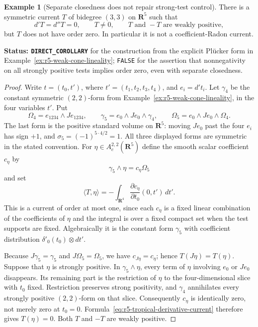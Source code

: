 \documentclass[11pt,a4paper]{article}
\numberwithin{equation}{section}
\theoremstyle{definition}
\newtheorem{example}[theorem]{Example}
\theoremstyle{remark}
\begin{document}
\begin{example}[Separate closedness does not repair strong-test control]
\label{ex:r5-closed-weak-nonradon-tropical}
There is a symmetric current $T$ of bidegree $(3,3)$ on
$\mathbf R^5$ such that
\[
 d'T=d''T=0,\qquad T\ne0,\qquad
 T\text{ and }-T\text{ are weakly positive},
\]
but $T$ does not have order zero.  In particular it is not a
coefficient-Radon current.
\end{example}

\noindent\textbf{Status: \texttt{DIRECT\_COROLLARY}} for the
construction from the explicit Pl\"ucker form in
Example~\ref{ex:r5-weak-cone-lineality};
\texttt{FALSE} for the assertion that nonnegativity on all strongly
positive tests implies order zero, even with separate closedness.

\begin{proof}
Write $t=(t_0,t')$, where $t'=(t_1,t_2,t_3,t_4)$, and
$e_i=d't_i$.  Let $\gamma_4$ be the constant symmetric
$(2,2)$-form from Example~\ref{ex:r5-weak-cone-lineality}, in the
four variables $t'$.  Put
\[
 \Omega_4=e_{1234}\wedge Je_{1234},\qquad
 \gamma_5=e_0\wedge Je_0\wedge\gamma_4,\qquad
 \Omega_5=e_0\wedge Je_0\wedge\Omega_4.
\]
The last form is the positive standard volume on $\mathbf R^5$:
moving $Je_0$ past the four $e_i$ has sign $+1$, and
$\sigma_5=(-1)^{5\cdot4/2}=1$.
All three displayed forms are symmetric in the stated convention.
For $\eta\in A_c^{2,2}(\mathbf R^5)$ define the smooth scalar
coefficient $c_\eta$ by
\[
                         \gamma_5\wedge\eta=c_\eta\Omega_5
\]
and set
\begin{equation}
       \langle T,\eta\rangle
       =-\int_{\mathbf R^4}
                   \frac{\partial c_\eta}{\partial t_0}(0,t')\,dt'.
 \label{eq:r5-tropical-derivative-current}
\end{equation}
This is a current of order at most one, since each $c_\eta$ is a
fixed linear combination of the coefficients of $\eta$ and the
integral is over a fixed compact set when the test supports are
fixed.  Algebraically it is the constant form $\gamma_5$ with
coefficient distribution $\delta'_0(t_0)\otimes dt'$.

Because $J\gamma_5=\gamma_5$ and $J\Omega_5=\Omega_5$,
we have $c_{J\eta}=c_\eta$; hence $T(J\eta)=T(\eta)$.
Suppose that $\eta$ is strongly positive.  In
$\gamma_5\wedge\eta$, every term of $\eta$ involving $e_0$
or $Je_0$ disappears.  Its remaining part is the restriction
of $\eta$ to the four-dimensional slice with $t_0$ fixed.
Restriction preserves strong positivity, and $\gamma_4$
annihilates every strongly positive $(2,2)$-form on that slice.
Consequently $c_\eta$ is identically zero, not merely zero at
$t_0=0$.  Formula~\eqref{eq:r5-tropical-derivative-current}
therefore gives $T(\eta)=0$.  Both $T$ and $-T$ are weakly
positive.


\end{proof}
\end{document}
